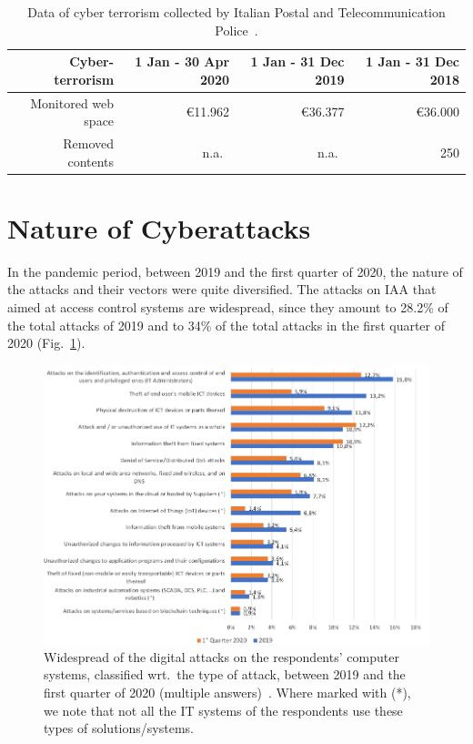 \documentclass{easychair}
\begin{document}
\begin{table}[h]
  \begin{center}
	\begin{tabular}{|r|r|r|r|}									
		\hline									
		\textbf{Cyber-terrorism}	&	1 Jan - 30 Apr 2020	&	1 Jan - 31 Dec 2019	&	1 Jan - 31 Dec 2018\\
		\hline									
		Monitored web space	&	\euro 11.962	&	\euro 36.377	&	\euro 36.000\\
		Removed contents 	&	n.a.\	&	n.a.\	&	250\\
		\hline	
	\end{tabular}
        \end{center}
	\caption{Data of cyber terrorism collected by Italian Postal and Telecommunication Police~\cite{oad20}.}									
	\label{tab:table3}									
\end{table}	

\section{Nature of Cyberattacks}\label{sec:TypeAttacks}

In the pandemic period, between 2019 and the first quarter of 2020, the nature of the attacks and their vectors were quite diversified.
The attacks on IAA that aimed at access control systems are widespread, since they amount to 28.2\% of the total attacks
of 2019 and to 34\% of the total attacks in the first quarter of 2020 (Fig.~\ref{fig:5}).

\begin{figure}
  \centering
  \includegraphics[width=1\textwidth]{pictures/fig5.png}
  \caption{Widespread of the digital attacks on the respondents' computer systems, classified wrt.\ the type of attack, between 2019 and the first quarter of 2020 (multiple answers)~\cite{oad20}. Where marked with (*), we note that not all the IT systems of the respondents use these types of solutions/systems.}
  \label{fig:5}
\end{figure}
\end{document}
